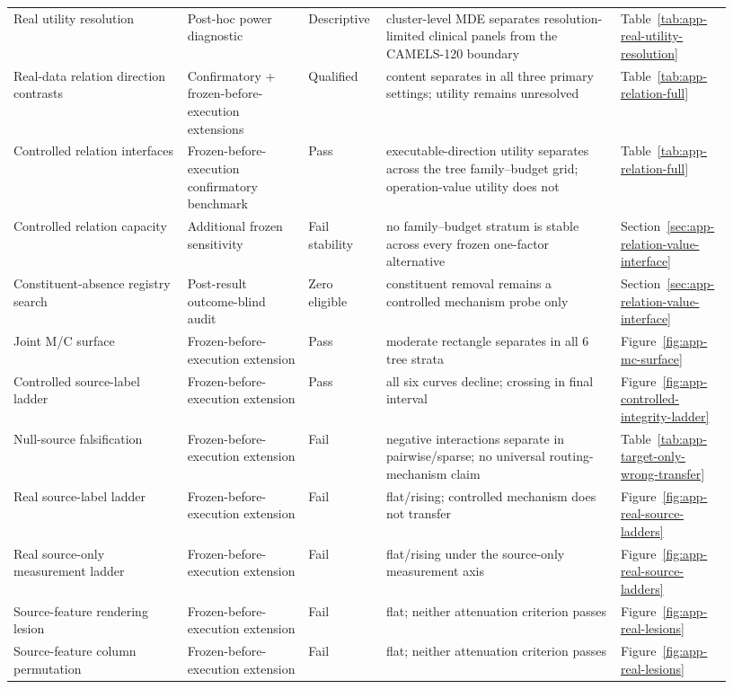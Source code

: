 \begin{longtable}{P{0.23\linewidth}P{0.16\linewidth}P{0.10\linewidth}P{0.31\linewidth}P{0.13\linewidth}}
Real utility resolution & Post-hoc power diagnostic & Descriptive & cluster-level MDE separates resolution-limited clinical panels from the CAMELS-120 boundary & Table~\ref{tab:app-real-utility-resolution} \\
Real-data relation direction contrasts & Confirmatory + frozen-before-execution extensions & Qualified & content separates in all three primary settings; utility remains unresolved & Table~\ref{tab:app-relation-full} \\
Controlled relation interfaces & Frozen-before-execution confirmatory benchmark & Pass & executable-direction utility separates across the tree family--budget grid; operation-value utility does not & Table~\ref{tab:app-relation-full} \\
Controlled relation capacity & Additional frozen sensitivity & Fail stability & no family--budget stratum is stable across every frozen one-factor alternative & Section~\ref{sec:app-relation-value-interface} \\
Constituent-absence registry search & Post-result outcome-blind audit & Zero eligible & constituent removal remains a controlled mechanism probe only & Section~\ref{sec:app-relation-value-interface} \\
Joint M/C surface & Frozen-before-execution extension & Pass & moderate rectangle separates in all 6 tree strata & Figure~\ref{fig:app-mc-surface} \\
Controlled source-label ladder & Frozen-before-execution extension & Pass & all six curves decline; crossing in final interval & Figure~\ref{fig:app-controlled-integrity-ladder} \\
Null-source falsification & Frozen-before-execution extension & Fail & negative interactions separate in pairwise/sparse; no universal routing-mechanism claim & Table~\ref{tab:app-target-only-wrong-transfer} \\
Real source-label ladder & Frozen-before-execution extension & Fail & flat/rising; controlled mechanism does not transfer & Figure~\ref{fig:app-real-source-ladders} \\
Real source-only measurement ladder & Frozen-before-execution extension & Fail & flat/rising under the source-only measurement axis & Figure~\ref{fig:app-real-source-ladders} \\
Source-feature rendering lesion & Frozen-before-execution extension & Fail & flat; neither attenuation criterion passes & Figure~\ref{fig:app-real-lesions} \\
Source-feature column permutation & Frozen-before-execution extension & Fail & flat; neither attenuation criterion passes & Figure~\ref{fig:app-real-lesions} \\

\end{longtable}
